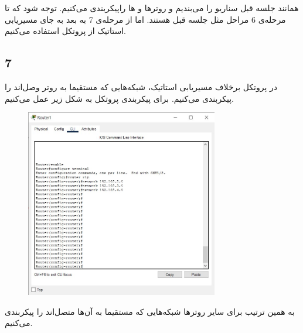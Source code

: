 \documentclass{article}
\begin{document}


\newpage



\section{}%
همانند جلسه قبل سناریو را می‌بندیم و روترها و ها راپیکربندی می‌کنیم. توجه شود که تا مرحله‌ی 6 مراحل مثل جلسه قبل هستند. اما از مرحله‌ی 7 به بعد به جای مسیریابی استاتیک از پروتکل  استفاده می‌کنیم.
\subsection{7}
در پروتکل  برخلاف مسیریابی استاتیک، شبکه‌هایی که مستقیما به روتر وصل‌اند را پیکربندی می‌کنیم. برای پیکربندی پروتکل  به شکل زیر عمل می‌کنیم.
\begin{figure}[H]
    \centering
    \includegraphics[width=0.75\textwidth]{figures/1.jpg}
    \caption{}
    \label{fig:fig1}
\end{figure}
به همین ترتیب برای سایر روترها شبکه‌هایی که مستقیما به آن‌ها متصل‌اند را پیکربندی می‌کنیم.
\end{document}
